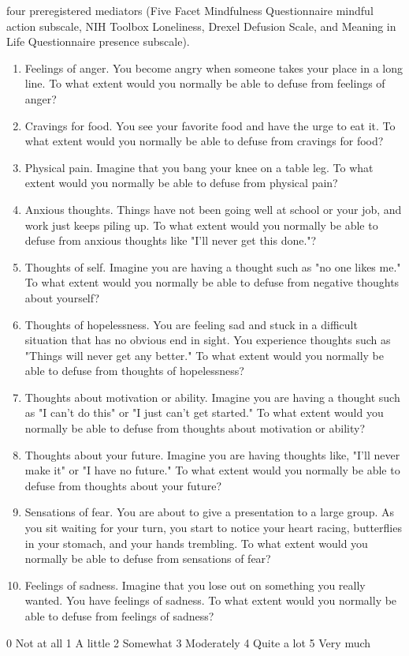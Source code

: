\documentclass[aspectratio=169]{beamer}
\theoremstyle{remark}
\begin{document}
\begin{frame}
    four preregistered mediators (Five Facet Mindfulness Questionnaire mindful action subscale, NIH Toolbox Loneliness, Drexel Defusion Scale, and Meaning in Life Questionnaire presence subscale).

    \begin{enumerate}
        \item Feelings of anger. You become angry when someone takes your place in a long line. To what extent would you normally be able to defuse from feelings of anger?
        \item Cravings for food. You see your favorite food and have the urge to eat it. To what extent would you normally be able to defuse from cravings for food?
        \item Physical pain. Imagine that you bang your knee on a table leg. To what extent would you normally be able to defuse from physical pain?
        \item Anxious thoughts. Things have not been going well at school or your job, and work just keeps piling up. To what extent would you normally be able to defuse from anxious thoughts like "I'll never get this done."?
        \item Thoughts of self. Imagine you are having a thought such as "no one likes me." To what extent would you normally be able to defuse from negative thoughts about yourself?
        \item Thoughts of hopelessness. You are feeling sad and stuck in a difficult situation that has no obvious end in sight. You experience thoughts such as "Things will never get any better." To what extent would you normally be able to defuse from thoughts of hopelessness?
        \item Thoughts about motivation or ability. Imagine you are having a thought such as "I can't do this" or "I just can't get started." To what extent would you normally be able to defuse from thoughts about motivation or ability?
        \item Thoughts about your future. Imagine you are having thoughts like, "I'll never make it" or "I have no future." To what extent would you normally be able to defuse from thoughts about your future?
        \item Sensations of fear. You are about to give a presentation to a large group. As you sit waiting for your turn, you start to notice your heart racing, butterflies in your stomach, and your hands trembling. To what extent would you normally be able to defuse from sensations of fear?
        \item Feelings of sadness. Imagine that you lose out on something you really wanted. You have feelings of sadness. To what extent would you normally be able to defuse from feelings of sadness?
    \end{enumerate}

    0 Not at all
    1 A little
    2 Somewhat
    3 Moderately
    4 Quite a lot
    5 Very much


\end{frame}
\end{document}
